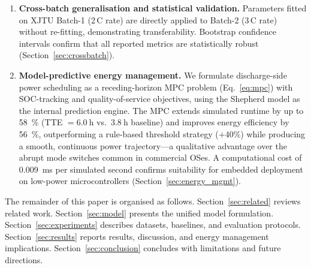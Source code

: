 \documentclass[5p,times,number]{elsarticle}
\newcommand{\secref}[1]{\textcolor{supercolor}{Section~\ref{#1}}}
\newcommand{\eqnrefp}[1]{\textcolor{supercolor}{Eq.~\ref{#1}}}
\begin{document}
\begin{enumerate}
    \item \textbf{Cross-batch generalisation and statistical validation.}
    Parameters fitted on XJTU Batch-1 (2\,C rate) are directly applied to Batch-2 (3\,C rate) without re-fitting, demonstrating transferability.
    Bootstrap confidence intervals confirm that all reported metrics are statistically robust (\secref{sec:crossbatch}).
    \item \textbf{Model-predictive energy management.}
    We formulate discharge-side power scheduling as a receding-horizon MPC problem (\eqnrefp{eq:mpc}) with SOC-tracking and quality-of-service objectives, using the Shepherd model as the internal prediction engine.  The MPC extends simulated runtime by up to \SI{58}{\percent} (TTE $= \SI{6.0}{\hour}$ vs.\ $\SI{3.8}{\hour}$ baseline) and improves energy efficiency by \SI{56}{\percent}, outperforming a rule-based threshold strategy ($+40\%$) while producing a smooth, continuous power trajectory---a qualitative advantage over the abrupt mode switches common in commercial OSes.
    A computational cost of \SI{0.009}{\milli\second} per simulated second confirms suitability for embedded deployment on low-power microcontrollers (\secref{sec:energy_mgmt}).
\end{enumerate}

The remainder of this paper is organised as follows.
\secref{sec:related} reviews related work.
\secref{sec:model} presents the unified model formulation.
\secref{sec:experiments} describes datasets, baselines, and evaluation protocols.
\secref{sec:results} reports results, discussion, and energy management implications.
\secref{sec:conclusion} concludes with limitations and future directions.

\end{document}
